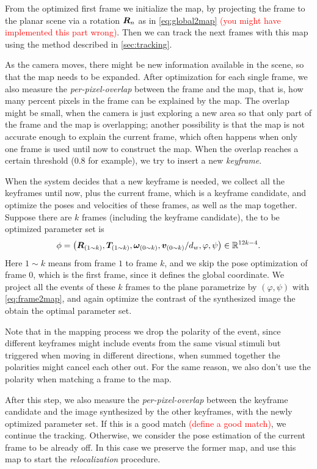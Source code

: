 From the optimized first frame we initialize the map, by projecting
the frame to the planar scene via a rotation $\mat{R}_n$ as in
\cref{eq:global2map} \textcolor{red}{(you might have implemented this
  part wrong)}. Then we can track the next frames with this map using
the method described in \cref{sec:tracking}.

As the camera moves, there might be new information available in the
scene, so that the map needs to be expanded. After optimization for
each single frame, we also measure the \textit{per-pixel-overlap}
between the frame and the map, that is, how many percent pixels in the
frame can be explained by the map. The overlap might be small, when
the camera is just exploring a new area so that only part of the frame
and the map is overlapping; another possibility is that the map is not
accurate enough to explain the current frame, which often happens when
only one frame is used until now to construct the map. When the
overlap reaches a certain threshold (0.8 for example), we try to
insert a new \textit{keyframe}.

When the system decides that a new keyframe is needed, we collect all
the keyframes until now, plus the current frame, which is a keyframe
candidate, and optimize the poses and velocities of these frames, as
well as the map together. Suppose there are $k$ frames (including the
keyframe candidate), the to be optimized parameter set is
\begin{equation*}
  \phi=\left(\mat{R}_{(1\sim k)},\vec{T}_{(1\sim
      k)},\bm{\omega}_{(0\sim k)},\vec{v}_{(0\sim
      k)}/d_w,\varphi,\psi\right)\in\mathbb{R}^{12k-4}.
\end{equation*}
Here $1\sim k$ means from frame $1$ to frame $k$, and we skip the pose
optimization of frame $0$, which is the first frame, since it defines
the global coordinate. We project all the events of these $k$ frames
to the plane parametrize by $(\varphi,\psi)$ with \cref{eq:frame2map},
and again optimize the contrast of the synthesized image the obtain
the optimal parameter set.

Note that in the mapping process we drop the polarity of the event,
since different keyframes might include events from the same visual
stimuli but triggered when moving in different directions, when summed
together the polarities might cancel each other out. For the same
reason, we also don't use the polarity when matching a frame to the
map.

After this step, we also measure the \textit{per-pixel-overlap}
between the keyframe candidate and the image synthesized by the other
keyframes, with the newly optimized parameter set. If this is a good
match \textcolor{red}{(define a good match)}, we continue the
tracking. Otherwise, we consider the pose estimation of the current
frame to be already off. In this case we preserve the former map, and
use this map to start the \textit{relocalization} procedure.

